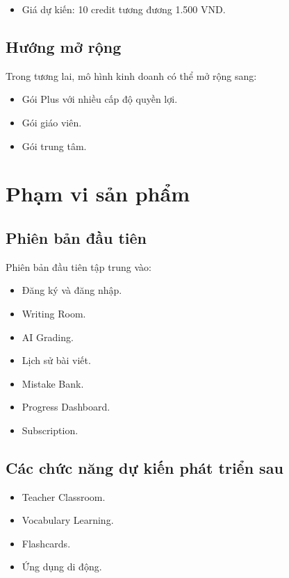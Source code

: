 \documentclass[12pt,a4paper]{article}
\begin{document}
\begin{itemize}
  \item Giá dự kiến: 10 credit tương đương 1.500 VND.
\end{itemize}

\subsection{Hướng mở rộng}

Trong tương lai, mô hình kinh doanh có thể mở rộng sang:

\begin{itemize}
  \item Gói Plus với nhiều cấp độ quyền lợi.
  \item Gói giáo viên.
  \item Gói trung tâm.
\end{itemize}

\section{Phạm vi sản phẩm}

\subsection{Phiên bản đầu tiên}

Phiên bản đầu tiên tập trung vào:

\begin{itemize}
  \item Đăng ký và đăng nhập.
  \item Writing Room.
  \item AI Grading.
  \item Lịch sử bài viết.
  \item Mistake Bank.
  \item Progress Dashboard.
  \item Subscription.
\end{itemize}

\subsection{Các chức năng dự kiến phát triển sau}

\begin{itemize}
  \item Teacher Classroom.
  \item Vocabulary Learning.
  \item Flashcards.
  \item Ứng dụng di động.
\end{itemize}
\end{document}
